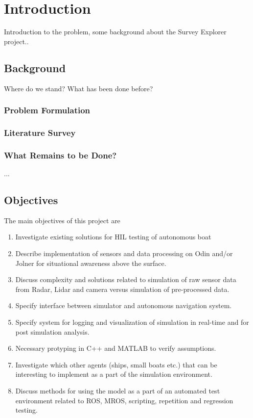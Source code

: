 \chapter{Introduction}
Introduction to the problem, some background about the Survey Explorer project..

\section{Background}
Where do we stand? What has been done before?
\subsection*{Problem Formulation}

\subsection*{Literature Survey}

\subsection*{What Remains to be Done?}
...
\section{Objectives}
The main objectives of this project are
\begin{enumerate}
\item Investigate existing solutions for HIL testing of autonomous boat
\item Describe implementation of sensors and data processing on Odin and/or Jolner for situational awareness above the surface.
\item Discuss complexity and solutions related to simulation of raw sensor data from Radar, Lidar and camera versus simulation of pre-processed data.  
\item Specify interface between simulator and autonomous navigation system.
\item Specify system for logging and visualization of simulation in real-time and for post simulation analysis.
\item Necessary protyping in C++ and MATLAB to verify assumptions.
\item Investigate which other agents (ships, small boats etc.) that can be interesting to implement as a part of the simulation environment.
\item Discuss methods for using the model as a part of an automated test environment related to ROS, MROS, scripting, repetition and regression testing.
\end{enumerate}

